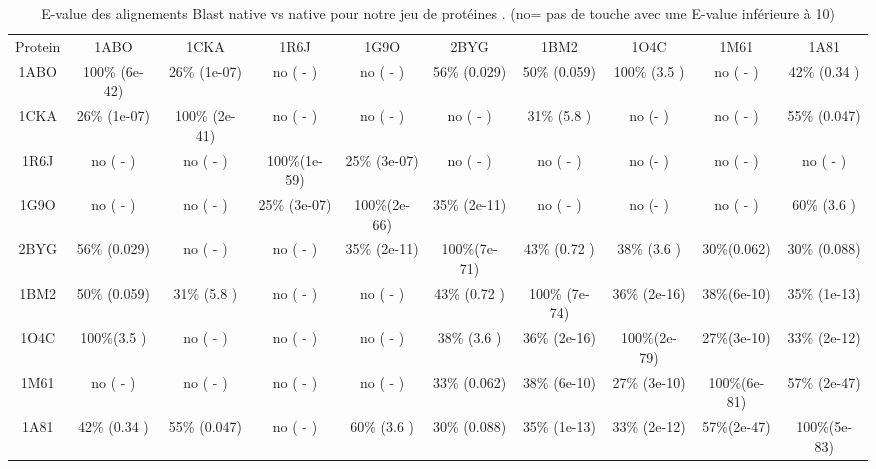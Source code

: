     \begin{table}[!htbp]
      \centering

      \begin{tabular}{cccccccccc}

        \toprule
     Protein & 1ABO  & 1CKA  & 1R6J & 1G9O & 2BYG & 1BM2  & 1O4C  & 1M61 & 1A81 \\
        \cmidrule{1-9}
        1ABO & 100\% (6e-42) &  26\% (1e-07) & no   ( -   ) & no   ( -   ) & 56\% (0.029) & 50\%  (0.059) & 100\% (3.5  ) & no   ( -   ) & 42\%  (0.34 ) \\     
        1CKA &  26\% (1e-07) & 100\% (2e-41) & no   ( -   ) & no   ( -   ) & no   ( -   ) & 31\%  (5.8  ) &  no   (-    ) &  no  ( -   ) &  55\% (0.047) \\
        1R6J &  no   ( -   ) & no    ( -   ) & 100\%(1e-59) & 25\% (3e-07) & no   ( -   ) & no    ( -   ) &  no   (-    ) &  no  ( -   ) &  no   ( -   ) \\ 
        1G9O &  no   ( -   ) & no    ( -   ) & 25\% (3e-07) & 100\%(2e-66) & 35\% (2e-11) & no    ( -   ) &  no   (-    ) &  no  ( -   ) &  60\% (3.6  ) \\
        2BYG &  56\% (0.029) & no    ( -   ) & no   ( -   ) & 35\% (2e-11) & 100\%(7e-71) & 43\%  (0.72 ) &  38\% (3.6  ) &  30\%(0.062) &  30\% (0.088) \\
        1BM2 &  50\% (0.059) & 31\%  (5.8  ) & no   ( -   ) & no   ( -   ) & 43\% (0.72 ) & 100\% (7e-74) &  36\% (2e-16) &  38\%(6e-10) &  35\% (1e-13) \\
        1O4C &  100\%(3.5  ) & no    ( -   ) & no   ( -   ) & no   ( -   ) & 38\% (3.6  ) & 36\%  (2e-16) &  100\%(2e-79) &  27\%(3e-10) &  33\% (2e-12) \\
        1M61 &  no   ( -   ) & no    ( -   ) & no   ( -   ) & no   ( -   ) & 33\% (0.062) & 38\%  (6e-10) &  27\% (3e-10) & 100\%(6e-81) &  57\% (2e-47) \\
        1A81 &  42\% (0.34 ) & 55\%  (0.047) & no   ( -   ) & 60\% (3.6  ) & 30\% (0.088) & 35\%  (1e-13) &  33\% (2e-12) &  57\%(2e-47) &  100\%(5e-83)  \\
        \bottomrule


      \end{tabular}      
      \caption{E-value des alignements Blast native vs native pour notre jeu de protéines . (no= pas de touche avec une E-value inférieure à 10)}
\label{tab:Xblast}      
    \end{table}







